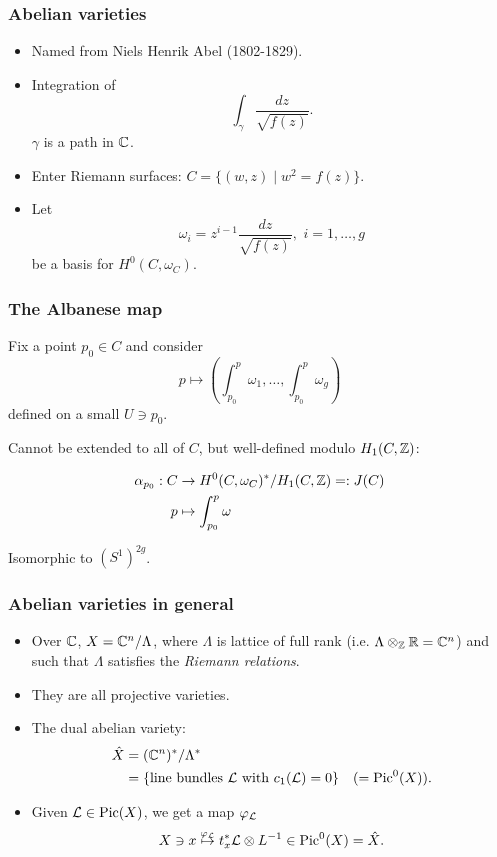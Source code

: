 \begin{frame}
\frametitle{Abelian varieties}

\begin{itemize}
	\item Named from Niels Henrik Abel (1802-1829).
	\item Integration of
	 \[
	\int_\gamma \frac{dz}{\sqrt{f(z)}}.
	\]
	$\gamma$ is a path in $\mathbb{C}$. \pause
	\item Enter Riemann surfaces: $C=\{ (w,z) \mid w^2=f(z) \}$.
	\item Let 
	\[
	\omega_i = z^{i-1} \frac{dz}{\sqrt{f(z)}}, \, \, i=1,\ldots,g
	\]
	be a basis for $H^0(C,\omega_C)$.
\end{itemize}

\end{frame}


\begin{frame}
\frametitle{The Albanese map}

Fix a point $p_0 \in C$ and consider
\[
p \mapsto \left(
\int_{p_0}^p \omega_1, \ldots,  \int_{p_0}^p \omega_g
\right)
\]
defined on a small $U \ni p_0$.
\pause

Cannot be extended to all of $C$, but well-defined modulo $H_1(C,\mathbb{Z})$:

\begin{align*}
\alpha_{p_0}:C &\to H^0(C,\omega_C)^\ast/ H_1(C,\mathbb{Z}) =: J(C) \\
p &\mapsto \int_{p_0}^p \omega
\end{align*}

Isomorphic to $(S^1)^{2g}$.
\end{frame}

\begin{frame}
\frametitle{Abelian varieties in general}

\begin{itemize}
	\item Over $\mathbb{C}$, $X=\mathbb{C}^n/\Lambda$, where $\Lambda$ is lattice of full rank (i.e. $\Lambda \otimes_{\mathbb{Z}} \mathbb{R} = \mathbb{C}^n$) and such that $\Lambda$ satisfies the \emph{Riemann relations}.
	\item They are all projective varieties.
	\item The \alert{dual abelian variety}:
	\begin{align*}
	\hat X &= (\mathbb{C}^n)^\ast/ \Lambda ^\ast \\
	&=\{ \text{line bundles $\mathcal{L}$ with $c_1(\mathcal{L})=0$} \} &(= \operatorname{Pic}^0(X)).
	\end{align*}
	\pause
	\item Given $\mathcal{L} \in \operatorname{Pic}(X)$, we get a map $\varphi_{\mathcal{L}}$
	\[
	X \ni x \stackrel{\varphi_{\mathcal{L}}}{\mapsto} t_x^\ast \mathcal{L} \otimes L^{-1} \in \operatorname{Pic}^0(X) = \hat X.
	\]
\end{itemize}

\end{frame}

